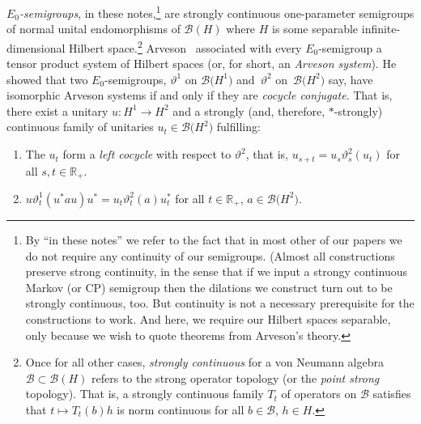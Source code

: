 \documentclass[pdftex]{sigma}%
\newcommand{\cmc}[1]{\mathcal{#1}}
\newcommand{\eus}[1]{\mathscr{#1}}
\newcommand{\bb}[1]{\mathbb{#1}}
\newcommand{\vt}{\vartheta}
\newcommand{\R}{\bb{R}}
\newcommand{\cB}{\cmc{B}}
\newcommand{\sB}{\eus{B}}
\numberwithin{equation}{section}
\newcommand{\bemp}{\begin{emp}}
\newcommand{\eemp}{\end{emp}}
\begin{document}
\bemp \label{EPS}\emph{$E_0$-semigroups}, in these notes,\footnote{By ``in these notes'' we refer to the fact that in most other of our papers we do not require any continuity of our semigroups. (Almost all constructions preserve strong continuity, in the sense that if we input a strongy continuous Markov (or CP) semigroup then the dilations we construct turn out to be strongly continuous, too. But continuity is not a necessary prerequisite for the constructions to work. And here, we require our Hilbert spaces separable, only because we wish to quote theorems from Arveson's theory.} are strongly continuous one-parameter semigroups of normal unital endomorphisms of $\sB(H)$ where $H$ is some separable infinite-dimensional Hilbert space.\footnote{Once for all other cases, \emph{strongly continuous} for a von Neumann algebra $\cB\subset\sB(H)$ refers to the strong operator topology (or the {\it point strong} topology). That is, a strongly continuous family $T_t$ of operators on $\cB$ satisfies that $t\mapsto T_t(b)h$ is norm continuous for all $b\in\cB$, $h\in H$.}
Arveson~\cite{Arv89} associated with every $E_0$-semigroup a tensor product system of Hilbert spaces (or, for short, an \emph{Arveson system}). He showed that two $E_0$-semigroups, $\vt^1$ on $\sB\big(H^1\big)$ and~$\vt^2$ on~$\sB\big(H^2\big)$ say, have isomorphic Arveson systems if and only if they are \emph{cocycle conjugate}. That is, there exist a unitary $u\colon H^1\rightarrow H^2$ and a strongly (and, therefore, $*$-strongly) continuous family of unitaries $u_t\in\sB\big(H^2\big)$ fulfilling:
\begin{enumerate}\itemsep=0pt
\item
The $u_t$ form a \emph{left cocycle} with respect to $\vt^2$, that is, $u_{s+t}=u_s\vt^2_s(u_t)$ for all $s,t\in\R_+$.

\item $u\vt^1_t(u^*au)u^*=u_t\vt^2_t(a)u_t^*$ for all $t\in\R_+$, $a\in\sB\big(H^2\big)$.
\end{enumerate}
\eemp
\end{document}
